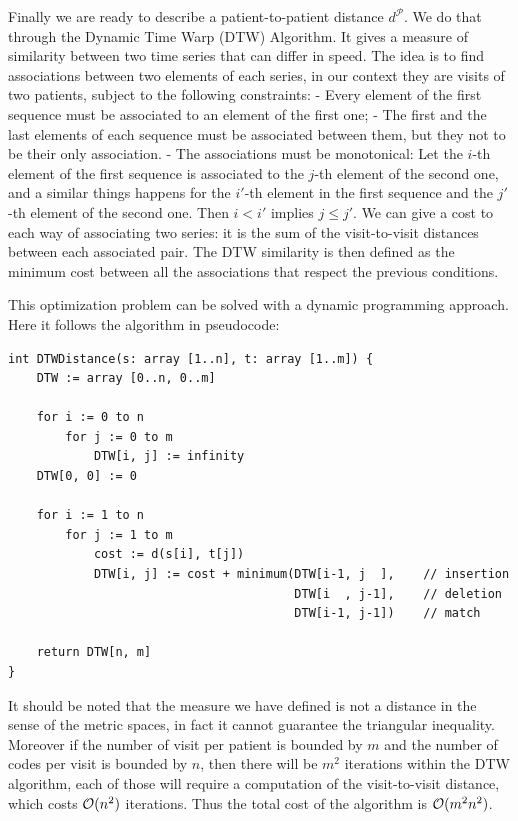 \documentclass[]{marticle}
\newcommand{\patients}{\mathcal{P}}
\begin{document}
Finally we are ready to describe a patient-to-patient distance $d^\patients$. We do that through
the Dynamic Time Warp (DTW) Algorithm. It gives a measure of similarity between two time series that can
differ in speed. The idea is to find associations between two elements of each series, in our
context they are visits of two patients, subject to the following constraints:
- Every element of the first sequence must be associated to an element of the first one;
- The first and the last elements of each sequence must be associated between them, but they not to
  be their only association.
- The associations must be monotonical: Let the $i$-th element of the first sequence is associated
  to the $j$-th element of the second one, and a similar things happens for the $i'$-th element in
  the first sequence and the $j'$-th element of the second one. Then $i<i'$ implies $j\leq j'$.
We can give a cost to each way of associating two series: it is the sum of the visit-to-visit
distances between each associated pair. The DTW similarity is then defined as the minimum cost
between all the associations that respect the previous conditions.

This optimization problem can be solved with a dynamic programming approach. Here it follows the
algorithm in pseudocode:
\begin{verbatim}
int DTWDistance(s: array [1..n], t: array [1..m]) {
    DTW := array [0..n, 0..m]
    
    for i := 0 to n
        for j := 0 to m
            DTW[i, j] := infinity
    DTW[0, 0] := 0
    
    for i := 1 to n
        for j := 1 to m
            cost := d(s[i], t[j])
            DTW[i, j] := cost + minimum(DTW[i-1, j  ],    // insertion
                                        DTW[i  , j-1],    // deletion
                                        DTW[i-1, j-1])    // match
    
    return DTW[n, m]
}
\end{verbatim}

It should be noted that the measure we have defined is not a distance in the sense of the metric
spaces, in fact it cannot guarantee the triangular inequality. Moreover if the number of visit per
patient is bounded by $m$ and the number of codes per visit is bounded by $n$, then there will be
$m^2$ iterations within the DTW algorithm, each of those will require a computation of the
visit-to-visit distance, which costs $\mathcal{O}(n^2)$ iterations. Thus the total cost of the
algorithm is $\mathcal{O}(m^2n^2)$.
\end{document}
